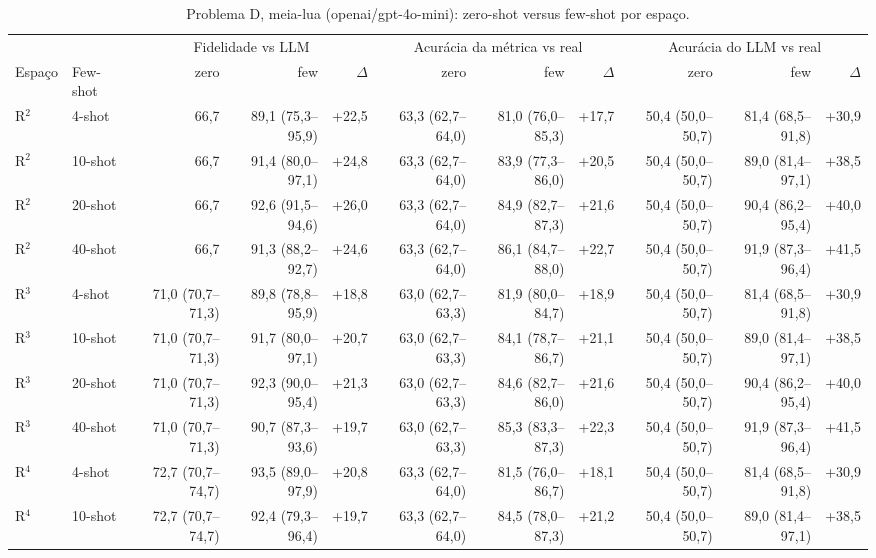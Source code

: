 \begin{table}[htbp]
\centering
\footnotesize
\caption{Problema D, meia-lua (openai/gpt-4o-mini): zero-shot versus few-shot por espaço.}
\label{tab:bloco1_D_zero_vs_fewshot_comparacao_gpt4mini}
\begin{tabular}{llrrrrrrrrr}
\toprule
 &  & \multicolumn{3}{c}{Fidelidade vs LLM} & \multicolumn{3}{c}{Acurácia da métrica vs real} & \multicolumn{3}{c}{Acurácia do LLM vs real} \\ \cmidrule(lr){3-5} \cmidrule(lr){6-8} \cmidrule(lr){9-11}
Espaço & Few-shot & zero & few & $\Delta$ & zero & few & $\Delta$ & zero & few & $\Delta$ \\
\midrule
R$^2$ & 4-shot & 66,7 & 89,1 (75,3–95,9) & +22,5 & 63,3 (62,7–64,0) & 81,0 (76,0–85,3) & +17,7 & 50,4 (50,0–50,7) & 81,4 (68,5–91,8) & +30,9 \\
R$^2$ & 10-shot & 66,7 & 91,4 (80,0–97,1) & +24,8 & 63,3 (62,7–64,0) & 83,9 (77,3–86,0) & +20,5 & 50,4 (50,0–50,7) & 89,0 (81,4–97,1) & +38,5 \\
R$^2$ & 20-shot & 66,7 & 92,6 (91,5–94,6) & +26,0 & 63,3 (62,7–64,0) & 84,9 (82,7–87,3) & +21,6 & 50,4 (50,0–50,7) & 90,4 (86,2–95,4) & +40,0 \\
R$^2$ & 40-shot & 66,7 & 91,3 (88,2–92,7) & +24,6 & 63,3 (62,7–64,0) & 86,1 (84,7–88,0) & +22,7 & 50,4 (50,0–50,7) & 91,9 (87,3–96,4) & +41,5 \\
\midrule
R$^3$ & 4-shot & 71,0 (70,7–71,3) & 89,8 (78,8–95,9) & +18,8 & 63,0 (62,7–63,3) & 81,9 (80,0–84,7) & +18,9 & 50,4 (50,0–50,7) & 81,4 (68,5–91,8) & +30,9 \\
R$^3$ & 10-shot & 71,0 (70,7–71,3) & 91,7 (80,0–97,1) & +20,7 & 63,0 (62,7–63,3) & 84,1 (78,7–86,7) & +21,1 & 50,4 (50,0–50,7) & 89,0 (81,4–97,1) & +38,5 \\
R$^3$ & 20-shot & 71,0 (70,7–71,3) & 92,3 (90,0–95,4) & +21,3 & 63,0 (62,7–63,3) & 84,6 (82,7–86,0) & +21,6 & 50,4 (50,0–50,7) & 90,4 (86,2–95,4) & +40,0 \\
R$^3$ & 40-shot & 71,0 (70,7–71,3) & 90,7 (87,3–93,6) & +19,7 & 63,0 (62,7–63,3) & 85,3 (83,3–87,3) & +22,3 & 50,4 (50,0–50,7) & 91,9 (87,3–96,4) & +41,5 \\
\midrule
R$^4$ & 4-shot & 72,7 (70,7–74,7) & 93,5 (89,0–97,9) & +20,8 & 63,3 (62,7–64,0) & 81,5 (76,0–86,7) & +18,1 & 50,4 (50,0–50,7) & 81,4 (68,5–91,8) & +30,9 \\
R$^4$ & 10-shot & 72,7 (70,7–74,7) & 92,4 (79,3–96,4) & +19,7 & 63,3 (62,7–64,0) & 84,5 (78,0–87,3) & +21,2 & 50,4 (50,0–50,7) & 89,0 (81,4–97,1) & +38,5 \\

\end{tabular}
\end{table}
